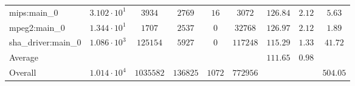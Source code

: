 \begin{tabular}{|l|c|c|c|c|c|c|c|c|}
mips:main\_0            & $ 3.102 \cdot 10^{1} $ & $ 3934    $ & $ 2769   $ & $ 16   $ & $ 3072   $ & $ 126.84      $ & $ 2.12    $ & $ 5.63    $ \\
mpeg2:main\_0           & $ 1.344 \cdot 10^{1} $ & $ 1707    $ & $ 2537   $ & $ 0    $ & $ 32768  $ & $ 126.97      $ & $ 2.12    $ & $ 1.89    $ \\
sha\_driver:main\_0     & $ 1.086 \cdot 10^{3} $ & $ 125154  $ & $ 5927   $ & $ 0    $ & $ 117248 $ & $ 115.29      $ & $ 1.33    $ & $ 41.72   $ \\
\hline
Average                 & $                    $ & $         $ & $        $ & $      $ & $        $ & $ 111.65      $ & $ 0.98    $ & $         $ \\
\hline
Overall                 & $ 1.014 \cdot 10^{4} $ & $ 1035582 $ & $ 136825 $ & $ 1072 $ & $ 772956 $ & $             $ & $         $ & $ 504.05  $ \\
\hline
\end{tabular}
